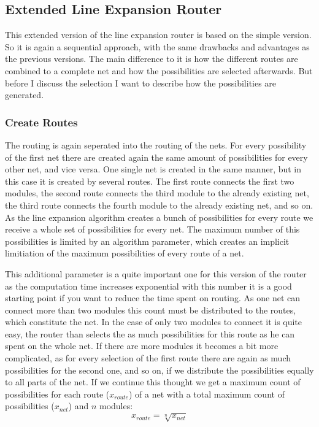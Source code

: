 \subsection{Extended Line Expansion Router}
This extended version of the line expansion router is based on the simple version. So it is again a sequential approach, with the same drawbacks and advantages as the previous versions. The main difference to it is how the different routes are combined to a complete net and how the possibilities are selected afterwards. But before I discuss the selection I want to describe how the possibilities are generated.

\subsubsection{Create Routes}
The routing is again seperated into the routing of the nets. For every possibility of the first net there are created again the same amount of possibilities for every other net, and vice versa. One single net is created in the same manner, but in this case it is created by several routes. The first route connects the first two modules, the second route connects the third module to the already existing net, the third route connects the fourth module to the already existing net, and so on. As the line expansion algorithm creates a bunch of possibilities for every route we receive a whole set of possibilities for every net. The maximum number of this possibilities is limited by an algorithm parameter, which creates an implicit limitiation of the maximum possibilities of every route of a net.

This additional parameter is a quite important one for this version of the router as the computation time increases exponential with this number it is a good starting point if you want to reduce the time spent on routing. As one net can connect more than two modules this count must be distributed to the routes, which constitute the net. In the case of only two modules to connect it is quite easy, the router than selects the as much possibilities for this route as he can spent on the whole net. If there are more modules it becomes a bit more complicated, as for every selection of the first route there are again as much possibilities for the second one, and so on, if we distribute the possibilities equally to all parts of the net. If we continue this thought we get a maximum count of possibilities for each route ($x_{route}$) of a net with a total maximum count of possibilities ($x_{net}$) and $n$ modules:
\[x_{route} = \sqrt[n]{x_{net}}\]

